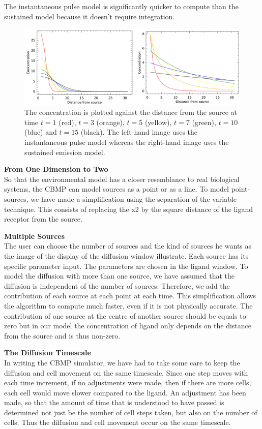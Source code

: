 \documentclass[12pt]{article}
\begin{document}
The instantaneous pulse model is significantly quicker to compute than the
sustained model because it doesn't require integration.

\begin{figure}[H]
\centering
\includegraphics[width=\textwidth]{media/sources2.png}
\caption{The concentration is plotted against the distance from the source
  at time \(t=1\) (red), \(t=3\) 
  (orange), \(t=5\) (yellow), \(t=7\) (green), \(t=10\) (blue) and \(t=15\) (black).
  The left-hand image uses the instantaneous pulse model whereas the right-hand 
  image uses the sustained emission model.} 
\end{figure}

{\bfseries From One Dimension to Two} \\
So that the environmental model has a closer resemblance to real 
biological systems, the CBMP can model sources as a point or as a line. 
To model point-sources, we have made a simplification using the 
separation of the variable technique. This consists of replacing the x2 
by the square distance of the ligand receptor from the source.

{\bfseries Multiple Sources} \\
The user can choose the number of sources and the kind of sources he 
wants as the image of the display of the diffusion window illustrate. 
Each source has its specific parameter input. The parameters are chosen 
in the ligand window. To model the diffusion with more than one source, 
we have assumed that the diffusion is independent of the number of 
sources. Therefore, we add the contribution of each source at each point 
at each time. This simplification allows the algorithm to compute much 
faster, even if it is not physically accurate. The contribution of one 
source at the centre of another source should be equals to zero but in 
our model the concentration of ligand only depends on the distance from 
the source and is thus non-zero. 

{\bfseries The Diffusion Timescale} \\
In writing the CBMP simulator, we have had to take some care to keep the 
diffusion and cell movement on the same timescale. Since one step moves 
with each time increment, if no adjustments were made, then if there are 
more cells, each cell would move slower compared to the ligand. An 
adjustment has been made, so that the amount of time that is understood 
to have passed is determined not just be the number of cell steps taken, 
but also on the number of cells. Thus the diffusion and cell movement 
occur on the same timescale.
\end{document}
